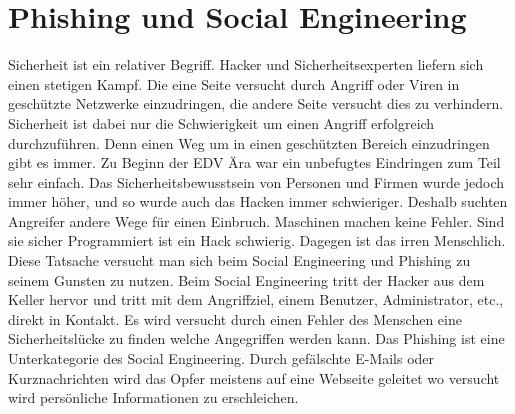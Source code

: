 \section{Phishing und Social Engineering}
Sicherheit ist ein relativer Begriff. Hacker und Sicherheitsexperten liefern sich einen stetigen Kampf. Die eine Seite versucht durch Angriff oder Viren in geschützte Netzwerke einzudringen, die andere Seite versucht dies zu verhindern.
Sicherheit ist dabei nur die Schwierigkeit um einen Angriff erfolgreich durchzuführen. Denn einen Weg um in einen geschützten Bereich einzudringen gibt es immer.
Zu Beginn der EDV Ära war ein unbefugtes Eindringen zum Teil sehr einfach. Das Sicherheitsbewusstsein von Personen und Firmen wurde jedoch immer höher, und so wurde auch das Hacken immer schwieriger. Deshalb suchten Angreifer andere Wege für einen Einbruch. 
Maschinen machen keine Fehler. Sind sie sicher Programmiert ist ein Hack schwierig. Dagegen ist das irren Menschlich. Diese Tatsache versucht man sich beim Social Engineering und Phishing zu seinem Gunsten zu nutzen.
Beim Social Engineering tritt der Hacker aus dem Keller hervor und tritt mit dem Angriffziel, einem Benutzer, Administrator, etc., direkt in Kontakt. Es wird versucht durch einen Fehler des Menschen eine Sicherheitslücke zu finden welche Angegriffen werden kann. 
Das Phishing ist eine Unterkategorie des Social Engineering. Durch gefälschte E-Mails oder Kurznachrichten wird das Opfer meistens auf eine Webseite geleitet wo versucht wird persönliche Informationen zu erschleichen.

